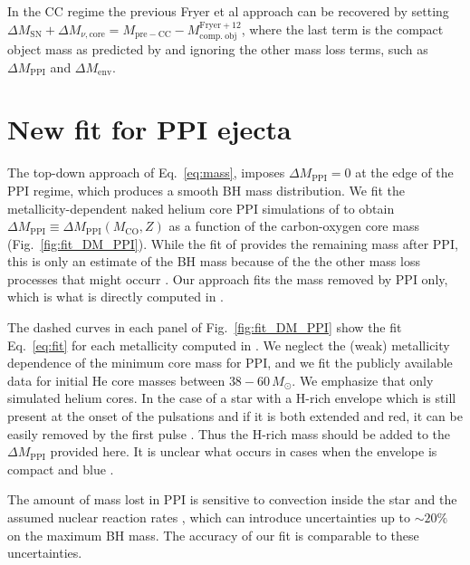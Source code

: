 \documentclass[twocolumn]{aastex63}
\DeclareRobustCommand{\Eqref}[1]{Eq.~\ref{#1}}
\DeclareRobustCommand{\Figref}[1]{Fig.~\ref{#1}}
\begin{document}
In the CC regime the previous Fryer et al approach can be recovered by setting
$\Delta M_\mathrm{SN} + \Delta M_{\nu, \mathrm{core}} = M_\mathrm{pre-CC} - M_\mathrm{comp.\ obj}^\mathrm{Fryer+12}$,
where the last term is the compact object mass as predicted by
\cite{fryer:12} and ignoring the other mass loss terms,
such as $\Delta M_\mathrm{PPI}$ and $\Delta M_\mathrm{env}$.

\section{New fit for PPI ejecta}

The top-down approach of \Eqref{eq:mass}, imposes
$\Delta M_\mathrm{PPI}=0$ at the edge of the PPI regime,
which produces a smooth BH mass
distribution. We fit the metallicity-dependent naked helium core PPI
simulations of \cite{farmer:19} to obtain
$\Delta M_\mathrm{PPI} \equiv \Delta M_\mathrm{PPI}(M_\mathrm{CO},Z)$ as
a function of the carbon-oxygen core mass (\Figref{fig:fit_DM_PPI}). While the fit of
\cite{farmer:19} provides the remaining mass after PPI, this is only
an estimate of the BH mass because of the the other mass loss processes that
might occurr \citep[e.g.,][]{renzo:20csm, powell:21, rahman:22}. Our approach
fits the mass removed by PPI only, which is what is directly computed
in \cite{farmer:19}.


The dashed curves in each panel of \Figref{fig:fit_DM_PPI} show the
fit \Eqref{eq:fit} for each metallicity computed in
\cite{farmer:19}. We neglect the (weak) metallicity dependence of the
minimum core mass for PPI, and we fit the publicly available data for initial He core
masses between $38-60\,M_\odot$.  We emphasize that \cite{farmer:19}
only simulated helium cores. In the case of a star with a H-rich envelope which is still
present at the onset of the pulsations and if it is both extended and red, it can be
easily removed by the first pulse \citep[][]{woosley:17,renzo:20csm}. Thus the H-rich mass should be added to the
$\Delta M_\mathrm{PPI}$ provided here. It is unclear what occurs in
cases when the envelope is compact and blue \cite{dicarlo:19, renzo:20merger, costa:21}.

The amount of mass lost in PPI is sensitive to convection inside the star
\citep{renzo:20conv} and the assumed nuclear reaction rates \citep{farmer:19,
  farmer:20, costa:21, woosley:21, mehta:21}, which can introduce
  uncertainties up to $\sim{}20\%$ on the maximum BH mass. The accuracy
of our fit is comparable to these uncertainties.
\vspace*{-20pt}
\end{document}
